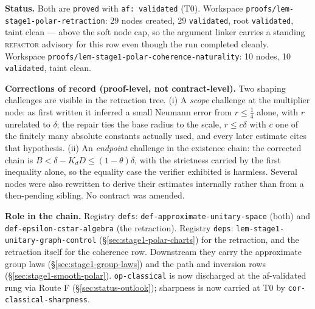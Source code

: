 \medskip
\noindent\textbf{Status.} Both are \texttt{proved} with \texttt{af: validated} (T0).
Workspace \texttt{proofs/lem-stage1-polar-retraction}: 29 nodes created, 29
\texttt{validated}, root \texttt{validated}, taint clean --- above the soft node cap, so the
argument linker carries a standing \textsc{refactor} advisory for this row even though the
run completed cleanly. Workspace \texttt{proofs/lem-stage1-polar-coherence-naturality}: 10
nodes, 10 \texttt{validated}, taint clean.

\noindent\textbf{Corrections of record (proof-level, not contract-level).} Two shaping
challenges are visible in the retraction tree. (i) A \emph{scope} challenge at the multiplier
node: as first written it inferred a small Neumann error from $r\le\tfrac14$ alone, with $r$
unrelated to $\delta$; the repair ties the base radius to the scale, $r\le c\delta$ with $c$
one of the finitely many absolute constants actually used, and every later estimate cites
that hypothesis. (ii) An \emph{endpoint} challenge in the existence chain: the corrected
chain is $B<\delta-K_dD\le(1-\theta)\delta$, with the strictness carried by the first
inequality alone, so the equality case the verifier exhibited is harmless. Several nodes were
also rewritten to derive their estimates internally rather than from a then-pending sibling.
No contract was amended.

\noindent\textbf{Role in the chain.} Registry \texttt{defs}:
\texttt{def-approximate-unitary-space} (both) and \texttt{def-epsilon-cstar-algebra} (the
retraction). Registry \texttt{deps}: \texttt{lem-stage1-unitary-graph-control}
(\S\ref{sec:stage1-polar-charts}) for the retraction, and the retraction itself for the
coherence row. Downstream they carry the approximate group laws
(\S\ref{sec:stage1-group-laws}) and the path and inversion rows
(\S\ref{sec:stage1-smooth-polar}). \texttt{op-classical} is now discharged at the af-validated rung via Route F (\S\ref{sec:status-outlook}); sharpness is now carried at T0 by \texttt{cor-classical-sharpness}.
